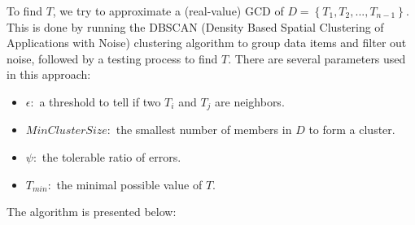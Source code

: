 \documentclass[final,oneside,onecolumn,12pt,a4paper]{book}%
\begin{document}
To find $T$, we try to approximate a (real-value) GCD of $D=\left\{
T_{1},T_{2},...,T_{n-1}\right\}  $. This is done by running the DBSCAN
(Density Based Spatial Clustering of Applications with Noise) clustering
algorithm \cite{Ester1996DBSCAN} to group data items and filter out noise,
followed by a testing process to find $T$. There are several parameters used
in this approach:

\begin{itemize}
\item $\epsilon:$ a threshold to tell if two $T_{i}$ and $T_{j}$ are neighbors.

\item $MinClusterSize:$ the smallest number of members in $D$ to form a cluster.

\item $\psi:$ the tolerable ratio of errors.

\item $T_{min}:$ the minimal possible value of $T$.
\end{itemize}

The algorithm is presented below:
\end{document}
